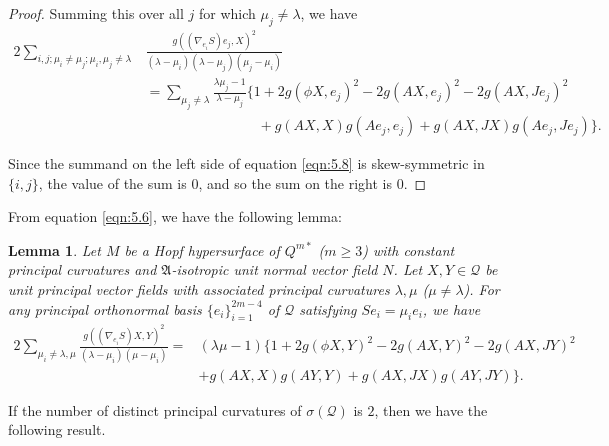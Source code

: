 \documentclass[reqno]{amsart}%
\newtheorem{lemma}[theorem]{Lemma}
\theoremstyle{definition}
\newtheorem{remark}{Remark}[section]
\numberwithin{equation}{section}
\begin{document}
\begin{proof}
Summing this over all $j$ for which $\mu_j\neq\lambda$, we have
%
\begin{equation}\label{eqn:5.8}
\begin{aligned}
2\sum_{i,j;\mu_i\neq\mu_j;\mu_i,\mu_j\neq\lambda}&\frac{g((\nabla_{e_i} S)e_j,X)^2}{(\lambda-\mu_i)(\lambda-\mu_j)(\mu_j-\mu_i)}\\
&=\sum_{\mu_j\neq\lambda}\frac{\lambda\mu_j-1}{\lambda-\mu_j}\Big\{1+2g(\phi X,e_j)^2-2g(AX,e_j)^2-2g(AX,Je_j)^2\\
&\qquad\qquad\qquad\qquad  +g(AX,X)g(Ae_j,e_j)+g(AX,JX)g(Ae_j,Je_j)\Big\}.
\end{aligned}
\end{equation}

Since the summand on the left side of equation \eqref{eqn:5.8} is skew-symmetric in $\{i,j\}$,
the value of the sum is $0$, and so the sum on the right is $0$.
\end{proof}


From equation \eqref{eqn:5.6}, we have the following lemma:

\begin{lemma}\label{lemma:5.4}
Let $M$ be a Hopf hypersurface of $Q^{m*}$ ($m\geq3$) with constant principal curvatures and $\mathfrak{A}$-isotropic unit normal vector field $N$. Let $X,Y\in \mathcal{Q}$ be unit principal vector fields with
associated principal curvatures $\lambda,\mu$ ($\mu\neq\lambda$). For any principal orthonormal basis $\{e_i\}_{i=1}^{2m-4}$ of
$\mathcal{Q}$ satisfying $Se_i=\mu_ie_i$, we have
%
\begin{equation}\label{eqn:call}
\begin{aligned}
2\sum_{\mu_i\neq\lambda,\mu}\frac{g((\nabla_{e_i} S)X,Y)^2}{(\lambda-\mu_i)(\mu-\mu_i)}
=&(\lambda\mu -1)\Big\{1+2g(\phi X,Y)^2-2g(AX,Y)^2-2g(AX,JY)^2\\
&  +g(AX,X)g(AY,Y)+g(AX,JX)g(AY,JY)\Big\}.
\end{aligned}
\end{equation}
\end{lemma}

If the number of distinct principal curvatures of $\sigma(\mathcal{Q})$ is $2$, then we have the following result.
\end{document}
